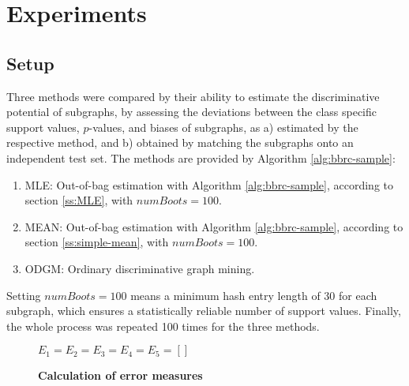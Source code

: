 \documentclass{sig-alternate}
\begin{document}
\section{Experiments}
\label{s:Experiments}

\subsection{Setup} 
\label{ss:Error-estimation} 
Three methods were compared by their ability to estimate the discriminative
potential of subgraphs, by assessing the deviations between the class specific
support values, $p$-values, and biases of subgraphs, as a) estimated by the respective
method, and b) obtained by matching the subgraphs onto an independent test set.
The methods are provided by Algorithm \ref{alg:bbrc-sample}:
\begin{enumerate} 
  \item MLE: Out-of-bag estimation with Algorithm \ref{alg:bbrc-sample}, according
    to section \ref{ss:MLE}, with $numBoots=100$.
  \item MEAN: Out-of-bag estimation with Algorithm \ref{alg:bbrc-sample}, according
    to section \ref{ss:simple-mean}, with $numBoots=100$.
  \item ODGM: Ordinary discriminative graph mining.
\end{enumerate}
Setting $numBoots=100$ means a minimum hash entry length 
of 30 for each subgraph, which ensures a statistically reliable number of support values. 
Finally, the whole process was repeated 100 times for the three methods.

\begin{figure*}[t]
  \begin{minipage}[h]{.59\textwidth}
    \begin{algorithm2e}[H]
      \fontsize{8}{10}
      \selectfont
      $E_1 =  E_2 =  E_3 =  E_4 =  E_5 =  \left[ \right]$\;
      \caption{\textbf{Calculation of error measures}\label{alg:pValEstimate}}
    \end{algorithm2e}
  \end{minipage}
  \begin{minipage}[h]{.39\textwidth}
    
  \end{minipage}
\end{figure*}
\end{document}
